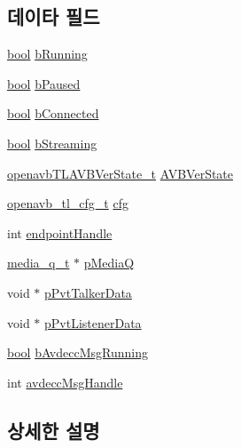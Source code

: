 \subsection*{데이타 필드}
\begin{DoxyCompactItemize}
\item 
\hyperlink{avb__gptp_8h_af6a258d8f3ee5206d682d799316314b1}{bool} \hyperlink{structtl__state__t_acf182b7b2127314d5d00c6df827734b5}{b\+Running}
\item 
\hyperlink{avb__gptp_8h_af6a258d8f3ee5206d682d799316314b1}{bool} \hyperlink{structtl__state__t_a482f6ada6075613ca714da569f763e90}{b\+Paused}
\item 
\hyperlink{avb__gptp_8h_af6a258d8f3ee5206d682d799316314b1}{bool} \hyperlink{structtl__state__t_a27fec7db63617379ec20651b83d27fc7}{b\+Connected}
\item 
\hyperlink{avb__gptp_8h_af6a258d8f3ee5206d682d799316314b1}{bool} \hyperlink{structtl__state__t_a3aa3817b2cc5c2c4382ceb050c83225d}{b\+Streaming}
\item 
\hyperlink{openavb__tl_8h_acf48266d3e9a42caae76e7bd4a8716d7}{openavb\+T\+L\+A\+V\+B\+Ver\+State\+\_\+t} \hyperlink{structtl__state__t_a9368e0b0a677e35e74adcd873e3f6b2b}{A\+V\+B\+Ver\+State}
\item 
\hyperlink{structopenavb__tl__cfg__t}{openavb\+\_\+tl\+\_\+cfg\+\_\+t} \hyperlink{structtl__state__t_a7b8161c0e9a273c59fbc1dfda943953e}{cfg}
\item 
int \hyperlink{structtl__state__t_ab3ab35067245073649b909ddc82c2807}{endpoint\+Handle}
\item 
\hyperlink{structmedia__q__t}{media\+\_\+q\+\_\+t} $\ast$ \hyperlink{structtl__state__t_a19b6a37a9e1222c5c08444ea175d6a45}{p\+MediaQ}
\item 
void $\ast$ \hyperlink{structtl__state__t_a18baa6360ea16357a2e906bc9bc4e61e}{p\+Pvt\+Talker\+Data}
\item 
void $\ast$ \hyperlink{structtl__state__t_a37b77c3754bf67c9e13a356a2ea70ec6}{p\+Pvt\+Listener\+Data}
\item 
\hyperlink{avb__gptp_8h_af6a258d8f3ee5206d682d799316314b1}{bool} \hyperlink{structtl__state__t_a8895d65375bebc7824af406834f9a4fd}{b\+Avdecc\+Msg\+Running}
\item 
int \hyperlink{structtl__state__t_a0ec8286c7813affa4fbe99bc5ce31f5a}{avdecc\+Msg\+Handle}
\end{DoxyCompactItemize}


\subsection{상세한 설명}



